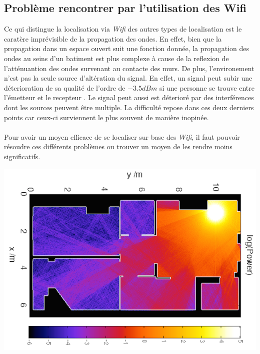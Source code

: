 \documentclass[11pt,journal,compsoc]{IEEEtran}
\begin{document}
  \subsection{Problème rencontrer par l'utilisation des Wifi}
    Ce qui distingue la localisation via \textit{Wifi} des autres types de localisation est le caratère imprévisible de la propagation des ondes. En effet, bien que la propagation dans un espace ouvert suit une fonction donnée, la propagation des ondes au seins d'un batiment est plus complexe à cause de la reflexion de l'atténuantion des ondes survenant au contacte des murs. De plus, l'environement n'est pas la seule source d'altération du signal. En effet, un signal peut subir une déterioration de sa qualité de l'ordre de $-3.5 dBm$ si une personne se trouve entre l'émetteur et le recepteur \cite{ETH}. Le signal peut aussi est déterioré par des interférences dont les sources peuvent être multiple. La difficulté repose dans ces deux derniers points car ceux-ci surviennent le plus souvent de manière inopinée.\\\\
    Pour avoir un moyen efficace de se localiser sur base des \textit{Wifi}, il faut pouvoir résoudre ces différents problèmes ou trouver un moyen de les rendre moins significatifs.
    \begin{center}
      \includegraphics[scale=0.3]{images/wifi-propagation.png}
    \end{center}
\end{document}
